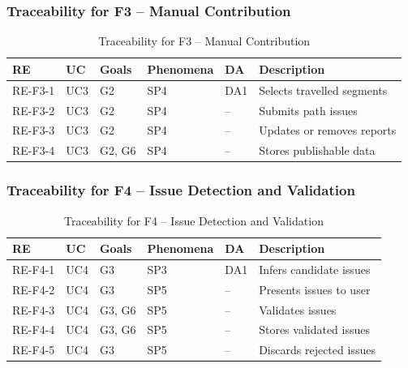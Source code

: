 \subsubsection{Traceability for F3 -- Manual Contribution}

\begin{table}[H]
\centering
\caption{Traceability for F3 -- Manual Contribution}
\label{tab:trace_f3}
  \begin{tabular}{@{}p{1.6cm}p{2cm}p{2.5cm}p{2.2cm}p{1cm}p{4cm}@{}}
  \toprule
  \textbf{RE} & \textbf{UC} & \textbf{Goals} & \textbf{Phenomena} & \textbf{DA} & \textbf{Description} \\
  \midrule
  RE-F3-1 & UC3 & G2 & SP4 & DA1 & Selects travelled segments \\
  RE-F3-2 & UC3 & G2 & SP4 & -- & Submits path issues \\
  RE-F3-3 & UC3 & G2 & SP4 & -- & Updates or removes reports \\
  RE-F3-4 & UC3 & G2, G6 & SP4 & -- & Stores publishable data \\
  \bottomrule
  \end{tabular}
\end{table}


\subsubsection{Traceability for F4 -- Issue Detection and Validation}

\begin{table}[H]
\centering
\caption{Traceability for F4 -- Issue Detection and Validation}
\label{tab:trace_f4}
  \begin{tabular}{@{}p{1.6cm}p{2cm}p{2.5cm}p{2.2cm}p{1cm}p{4cm}@{}}
  \toprule
  \textbf{RE} & \textbf{UC} & \textbf{Goals} & \textbf{Phenomena} & \textbf{DA} & \textbf{Description} \\
  \midrule
  RE-F4-1 & UC4 & G3 & SP3 & DA1 & Infers candidate issues \\
  RE-F4-2 & UC4 & G3 & SP5 & -- & Presents issues to user \\
  RE-F4-3 & UC4 & G3, G6 & SP5 & -- & Validates issues \\
  RE-F4-4 & UC4 & G3, G6 & SP5 & -- & Stores validated issues \\
  RE-F4-5 & UC4 & G3 & SP5 & -- & Discards rejected issues \\
  \bottomrule
  \end{tabular}
\end{table}


